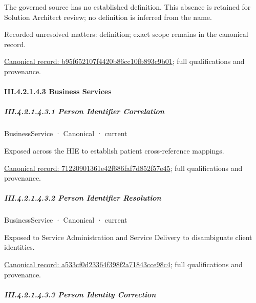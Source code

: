 The governed source has no established definition. This absence is retained for Solution Architect review; no definition is inferred from the name.


{\small Recorded unresolved matters: definition; exact scope remains in the canonical record.}\par
{\footnotesize \href{../../../../continuum/business/business-service/b95f652107f4420b86cc10fb893c9b01.md}{Canonical record: b95f652107f4420b86cc10fb893c9b01}; full qualifications and provenance.}\par
\paragraph*{III.4.2.1.4.3 Business Services}
\label{navigation:III.4.2.1.4.3}

\subparagraph*{III.4.2.1.4.3.1 Person Identifier Correlation}
\label{navigation:III.4.2.1.4.3.1}

\label{element:71220901361e42f686faf7d852f57e45}
{\small BusinessService · Canonical · current}\par

Exposed across the HIE to establish patient cross-reference mappings.


{\footnotesize \href{../../../../continuum/business/business-service/71220901361e42f686faf7d852f57e45.md}{Canonical record: 71220901361e42f686faf7d852f57e45}; full qualifications and provenance.}\par
\subparagraph*{III.4.2.1.4.3.2 Person Identifier Resolution}
\label{navigation:III.4.2.1.4.3.2}

\label{element:a533cf0d23364f398f2a71843cce98c4}
{\small BusinessService · Canonical · current}\par

Exposed to Service Administration and Service Delivery to disambiguate client identities.


{\footnotesize \href{../../../../continuum/business/business-service/a533cf0d23364f398f2a71843cce98c4.md}{Canonical record: a533cf0d23364f398f2a71843cce98c4}; full qualifications and provenance.}\par
\subparagraph*{III.4.2.1.4.3.3 Person Identity Correction}
\label{navigation:III.4.2.1.4.3.3}

